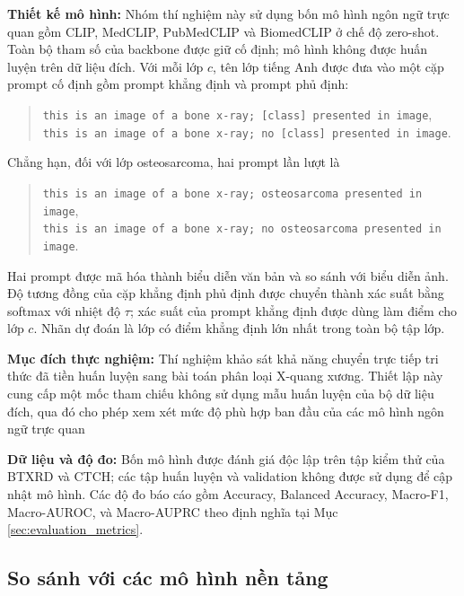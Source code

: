 \textbf{Thiết kế mô hình:} Nhóm thí nghiệm này sử dụng bốn mô hình ngôn ngữ
trực quan gồm CLIP, MedCLIP, PubMedCLIP và BiomedCLIP ở chế độ zero-shot. Toàn
bộ tham số của backbone được giữ cố định; mô hình không được huấn luyện trên dữ liệu đích. Với mỗi lớp $c$, tên lớp tiếng Anh được đưa vào một cặp prompt cố định gồm prompt khẳng định và prompt phủ định:
\begin{quote}
\texttt{this is an image of a bone x-ray; [class] presented in image},\\
\texttt{this is an image of a bone x-ray; no [class] presented in image}.
\end{quote}
Chẳng hạn, đối với lớp osteosarcoma, hai prompt lần lượt là
\begin{quote}
\texttt{this is an image of a bone x-ray; osteosarcoma presented in image}, \\
\texttt{this is an image of a bone x-ray; no osteosarcoma presented in image}.
\end{quote}
Hai prompt được mã hóa thành biểu diễn văn bản và so sánh với biểu diễn ảnh. Độ tương đồng của cặp khẳng định phủ định được chuyển thành xác suất bằng softmax với nhiệt độ $\tau$; xác suất của prompt khẳng định được dùng làm điểm cho lớp $c$. Nhãn dự đoán là lớp có điểm khẳng định lớn nhất trong toàn bộ tập lớp.

\textbf{Mục đích thực nghiệm:} Thí nghiệm khảo sát khả năng chuyển trực tiếp
tri thức đã tiền huấn luyện sang bài toán phân loại X-quang xương. Thiết lập này cung cấp một mốc tham chiếu không sử dụng mẫu huấn luyện của bộ dữ liệu đích, qua đó cho phép xem xét mức độ phù hợp ban đầu của các mô hình ngôn ngữ trực quan

\textbf{Dữ liệu và độ đo:} Bốn mô hình được đánh giá độc lập trên tập kiểm thử của BTXRD và CTCH; các tập huấn luyện và validation không được sử dụng để cập nhật mô hình. Các độ đo báo cáo gồm Accuracy, Balanced Accuracy, Macro-F1, Macro-AUROC, và Macro-AUPRC theo định nghĩa tại Mục \ref{sec:evaluation_metrics}.

\subsection{So sánh với các mô hình nền tảng}
\label{subsec:foundation_model_comparison}

